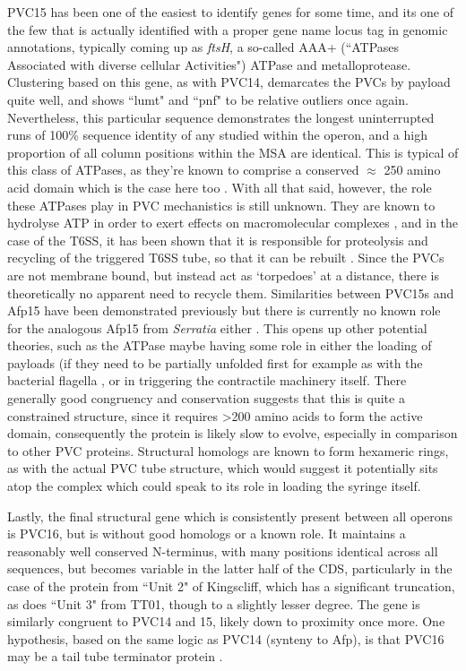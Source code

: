 PVC15 has been one of the easiest to identify genes for some time, and its one of the few that is actually identified with a proper gene name locus tag in genomic annotations, typically coming up as \emph{ftsH}, a so-called AAA+ (``ATPases Associated with diverse cellular Activities") ATPase and metalloprotease. Clustering based on this gene, as with PVC14, demarcates the PVCs by payload quite well, and shows ``lumt" and ``pnf" to be relative outliers once again. Nevertheless, this particular sequence demonstrates the longest uninterrupted runs of 100\% sequence identity of any studied within the operon, and a high proportion of all column positions within the MSA are identical. This is typical of this class of ATPases, as they're known to comprise a conserved $\approx$ 250 amino acid domain which is the case here too \citep{Hanson2005}. With all that said, however, the role these ATPases play in PVC mechanistics is still unknown. They are known to hydrolyse ATP in order to exert effects on macromolecular complexes \citep{Erzberger2006}, and in the case of the T6SS, it has been shown that it is responsible for proteolysis and recycling of the triggered T6SS tube, so that it can be rebuilt \citep{Bonemann2009, Forster2014}. Since the PVCs are not membrane bound, but instead act as `torpedoes' at a distance, there is theoretically no apparent need to recycle them. Similarities between PVC15s and Afp15 have been demonstrated previously but there is currently no known role for the analogous Afp15 from \emph{Serratia} either \citep{Hurst2004}. This opens up other potential theories, such as the ATPase maybe having some role in either the loading of payloads (if they need to be partially unfolded first for example as with the bacterial flagella \citep{Muskotal2006}, or in triggering the contractile machinery itself. There generally good congruency and conservation suggests that this is quite a constrained structure, since it requires \textgreater 200 amino acids to form the active domain, consequently the protein is likely slow to evolve, especially in comparison to other PVC proteins. Structural homologs are known to form hexameric rings, as with the actual PVC tube structure, which would suggest it potentially sits atop the complex which could speak to its role in loading the syringe itself.

Lastly, the final structural gene which is consistently present between all operons is PVC16, but is without good homologs or a known role. It maintains a reasonably well conserved N-terminus, with many positions identical across all sequences, but becomes variable in the latter half of the CDS, particularly in the case of the protein from ``Unit 2" of Kingscliff, which has a significant truncation, as does ``Unit 3" from TT01, though to a slightly lesser degree. The gene is similarly congruent to PVC14 and 15, likely down to proximity once more. One hypothesis, based on the same logic as PVC14 (synteny to Afp), is that PVC16 may be a tail tube terminator protein \citep{Rybakova2013}.

